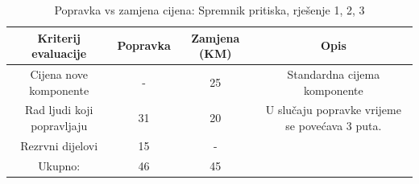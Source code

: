 \documentclass[12pt]{article}
\begin{document}
\begin{landscape}
\vspace*{\fill}
\begin{table}[htbp]
  \centering
  \footnotesize
  \caption{Popravka vs zamjena cijena: Spremnik pritiska, rješenje 1, 2, 3}
    \begin{tabular}{cccc}
    \toprule
    Kriterij evaluacije & Popravka & Zamjena (KM) & Opis \\
    \midrule
     Cijena nove komponente & -     & 25    & \multicolumn{1}{p{19.57em}}{Standardna \newline{}cijema\newline{} komponente} \\
    \midrule
    Rad ljudi koji popravljaju & 31    & 20    & \multicolumn{1}{p{19.57em}}{ U slučaju popravke vrijeme se povećava 3 puta. } \\
    \midrule
    Rezrvni dijelovi & 15    & -     &  \\
    \midrule
    Ukupno: & 46    & 45    &  \\
    \bottomrule
    \end{tabular}%
  \label{tab:popravka11}%
\end{table}%

\vspace*{\fill}
\end{landscape}
\end{document}
